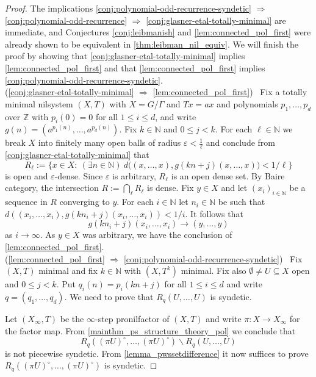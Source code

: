 \documentclass{article}
\theoremstyle{plain}
\theoremstyle{claim}
\theoremstyle{definition}
\theoremstyle{plain}
\theoremstyle{plain}
\newcommand{\N}{\mathbb{N}}
\newcommand{\Z}{\mathbb{Z}}
\renewcommand{\epsilon}{\varepsilon}
\renewcommand{\setminus}{\backslash}
\newcommand{\1}{\boldsymbol{1}}
\begin{document}
\begin{proof}
The implications \cref{conj:polynomial-odd-recurrence-syndetic} $\Rightarrow$ \cref{conj:polynomial-odd-recurrence} $\Rightarrow$ \cref{conj:glasner-etal-totally-minimal} are immediate, and Conjectures \ref{conj:leibmanish} and \ref{lem:connected_pol_first} were already shown to be equivalent in \cref{thm:leibman_nil_equiv}. We will finish the proof by showing that \cref{conj:glasner-etal-totally-minimal} implies \cref{lem:connected_pol_first} and that \cref{lem:connected_pol_first} implies \cref{conj:polynomial-odd-recurrence-syndetic}.\\

(\cref{conj:glasner-etal-totally-minimal} $\Rightarrow$ \cref{lem:connected_pol_first}) \ 
Fix a totally minimal nilsystem $(X, T)$ with $X = G/\Gamma$ and $T x = ax$ and polynomials $p_1,\dots,p_d$ over $\Z$ with $p_i(0) = 0$ for all $1 \le i \le d$, and write $g(n) = (a^{p_1(n)},\dots,a^{p_d(n)})$.
Fix $k \in \N$ and $0 \le j < k$.
For each $\ell \in \N$ we break $X$ into finitely many open balls of radius $\epsilon < \tfrac{1}{\ell}$ and conclude from \cref{conj:glasner-etal-totally-minimal} that
\[
R_\ell := \Big\{x\in X: \ (\exists n\in\N)\ d\big((x,\dots,x), g(kn+j)(x,\dots,x)\big)<1/\ell\Big\}
\]
is open and $\epsilon$-dense.
Since $\epsilon$ is arbitrary, $R_\ell$ is an open dense set.
By Baire category, the intersection $R:=\bigcap_\ell R_\ell$ is dense.
Fix $y \in X$ and let $(x_i)_{i \in \N}$ be a sequence in $R$ converging to $y$.
For each $i\in\N$ let $n_i\in\N$ be such that $d((x_i,\dots,x_i),g(kn_i + j)(x_i,\dots,x_i))<1/i$. 
It follows that
\[
g(kn_i + j)(x_i,\dots,x_i) \to (y,\dots,y)
\]
as $i\to\infty$. As $y \in X$ was arbitrary, we have the conclusion of \cref{lem:connected_pol_first}.\\


(\cref{lem:connected_pol_first} $\Rightarrow$ \cref{conj:polynomial-odd-recurrence-syndetic}) \ 
Fix $(X,T)$ minimal and fix $k \in \N$ with $(X,T^k)$ minimal.
Fix also $\emptyset \ne U \subseteq X$ open and $0 \le j < k$.
Put $q_i(n) = p_i(kn+j)$ for all $1 \le i \le d$ and write $q = (q_1,\dots,q_d)$.
We need to prove that $R_q(U,\dots,U)$ is syndetic.

Let $(X_{\infty}, T)$ be the $\infty$-step pronilfactor of $(X, T)$ and write $\pi: X \to X_{\infty}$ for the factor map.
From \cref{mainthm_ps_structure_theory_pol} we conclude that
\[
    R_q((\pi U)^\circ, \ldots, (\pi U)^\circ) \setminus R_q(U, \ldots, U) 
\]
is not piecewise syndetic.
From \cref{lemma_pwssetdifference} it now suffices to prove $R_q((\pi U)^\circ, \ldots, (\pi U)^\circ)$ is syndetic.


\end{proof}
\end{document}

